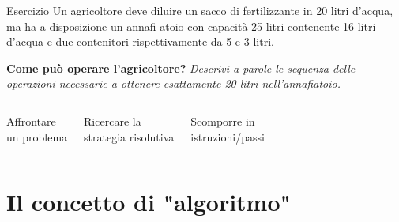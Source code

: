 \documentclass[
    notheorems,
    11pt,
    compress,
    aspectratio=169
]{beamer}
\begin{document}
\begin{frame}{Esercizio}
    Un agricoltore deve diluire un sacco di fertilizzante in 20 litri d’acqua, ma ha a disposizione un annafi atoio con capacità 25 litri contenente 16 litri d’acqua e due contenitori rispettivamente da 5 e 3 litri.

    \vspace{0.25cm}

    \textbf{Come può operare l’agricoltore?} \textit{Descrivi a parole le sequenza delle operazioni necessarie a ottenere esattamente 20 litri nell’annafiatoio.}

    \vspace{1cm}

    \begin{columns}
        
        \begin{block}{}
            \centering
            Affrontare\\un problema
        \end{block}
        
        
        \begin{block}{}
            \centering
            Ricercare la\\strategia risolutiva
        \end{block}

        
        \begin{block}{}
            \centering
            Scomporre in\\istruzioni/passi
        \end{block}
    \end{columns}
\end{frame}


\section{Il concetto di "algoritmo"}
\end{document}
